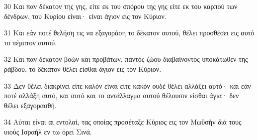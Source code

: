 \par 30 Και παν δέκατον της γης, είτε εκ του σπόρου της γης είτε εκ του καρπού των δένδρων, του Κυρίου είναι· είναι άγιον εις τον Κύριον.
\par 31 Και εάν ποτέ θελήση τις να εξαγοράση το δέκατον αυτού, θέλει προσθέσει εις αυτό το πέμπτον αυτού.
\par 32 Και παν δέκατον βοών και προβάτων, παντός ζώου διαβαίνοντος υποκάτωθεν της ράβδου, το δέκατον θέλει είσθαι άγιον εις τον Κύριον.
\par 33 Δεν θέλει διακρίνει είτε καλόν είναι είτε κακόν ουδέ θέλει αλλάξει αυτό· και εάν ποτέ αλλάξη αυτό, και αυτό και το αντάλλαγμα αυτού θέλουσιν είσθαι άγια· δεν θέλει εξαγορασθή.
\par 34 Αύται είναι αι εντολαί, τας οποίας προσέταξε Κύριος εις τον Μωϋσήν διά τους υιούς Ισραήλ εν τω όρει Σινά.


